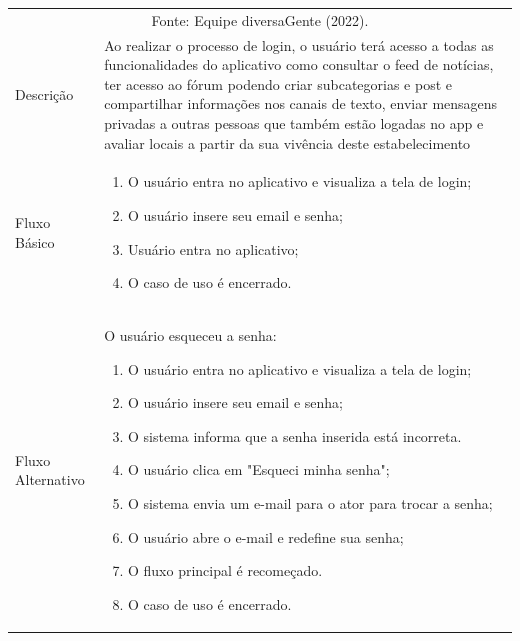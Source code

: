 \documentclass[
    12pt,               %
    openright,          %
    oneside,
    a4paper,            %
    paginasA3,  %
    BIBLATEX,           %
    REFINDENT,          %
    MODELO,             %
    TODO,               %
    english,            %
    brazil              %
    ]{ifsp-spo-inf-ctds} %
\providecommand{\DIFadd}[1]{{\protect\color{blue}\uwave{#1}}} %
\providecommand{\DIFaddbegin}{} %
\providecommand{\DIFaddend}{} %
\providecommand{\DIFdelbegin}{} %
\providecommand{\DIFdelend}{} %
\begin{document}
\begin{apendicesenv}
\begin{quadro}[htb]
	\centering
	\ABNTEXfontereduzida
	\DIFdelbegin %
\DIFdelend \caption[Caso de Uso Fazer Login]{Caso de Uso Fazer Login}
	\DIFaddbegin \label{casos-de-uso1}
\DIFaddend \end{quadro}
\begin{longtable}{|p{3.3cm}|p{12.3cm}|}
	\hline
	\thead{} & \thead{Ator} \\
	\hline
	\DIFaddbegin \endfirsthead
	\multicolumn{2}{c}{\scriptsize Fonte: Equipe diversaGente (2022).}%
	{{\bfseries \autoref{casos-de-uso1} \DIFadd{continued from previous page}}} \\
	\endhead
	\DIFaddend Descrição & Ao realizar o processo de login, o usuário terá acesso a todas as funcionalidades do aplicativo como consultar o feed de notícias, ter acesso ao fórum podendo criar subcategorias e post e compartilhar informações nos canais de texto, enviar mensagens privadas a outras pessoas que também estão logadas no app e avaliar locais a partir da sua vivência deste estabelecimento \\
	\hline
	Fluxo Básico  & 
	\begin{enumerate}
		\item O usuário entra no aplicativo e visualiza a tela de login;
		\item O usuário insere seu email e senha;
		\item Usuário entra no aplicativo;
		\item O caso de uso é encerrado. 
	\end{enumerate}\\
	\hline
	Fluxo Alternativo  & O usuário esqueceu a senha:
	\begin{enumerate}
		\item O usuário entra no aplicativo e visualiza a tela de login;
		\item O usuário insere seu email e senha;
		\item O sistema informa que a senha inserida está incorreta.
		\item O usuário clica em "Esqueci minha senha";
		\item O sistema envia um e-mail para o ator para trocar a senha;
		\item O usuário abre o e-mail e redefine sua senha;
		\item O fluxo principal é recomeçado.
		\item O caso de uso é encerrado.
	\end{enumerate} \\

\end{longtable}
\end{apendicesenv}
\end{document}
